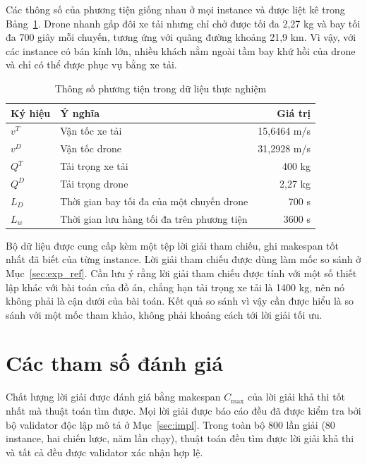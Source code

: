 \documentclass[../DoAn.tex]{subfiles}
\begin{document}
Các thông số của phương tiện giống nhau ở mọi instance và được liệt kê trong Bảng~\ref{tab:vehicle}. Drone nhanh gấp đôi xe tải nhưng chỉ chở được tối đa 2,27 kg và bay tối đa 700 giây mỗi chuyến, tương ứng với quãng đường khoảng 21,9 km. Vì vậy, với các instance có bán kính lớn, nhiều khách nằm ngoài tầm bay khứ hồi của drone và chỉ có thể được phục vụ bằng xe tải.

\begin{table}[H]
\centering
\caption{Thông số phương tiện trong dữ liệu thực nghiệm}
\label{tab:vehicle}
\begin{tabular}{llr}
\toprule
\textbf{Ký hiệu} & \textbf{Ý nghĩa} & \textbf{Giá trị} \\
\midrule
$v^T$ & Vận tốc xe tải & 15,6464 m/s \\
$v^D$ & Vận tốc drone & 31,2928 m/s \\
$Q^T$ & Tải trọng xe tải & 400 kg \\
$Q^D$ & Tải trọng drone & 2,27 kg \\
$L_D$ & Thời gian bay tối đa của một chuyến drone & 700 s \\
$L_w$ & Thời gian lưu hàng tối đa trên phương tiện & 3600 s \\
\bottomrule
\end{tabular}
\end{table}

Bộ dữ liệu được cung cấp kèm một tệp lời giải tham chiếu, ghi makespan tốt nhất đã biết của từng instance. Lời giải tham chiếu được dùng làm mốc so sánh ở Mục~\ref{sec:exp_ref}. Cần lưu ý rằng lời giải tham chiếu được tính với một số thiết lập khác với bài toán của đồ án, chẳng hạn tải trọng xe tải là 1400 kg, nên nó không phải là cận dưới của bài toán. Kết quả so sánh vì vậy cần được hiểu là so sánh với một mốc tham khảo, không phải khoảng cách tới lời giải tối ưu.

\section{Các tham số đánh giá}
\label{sec:exp_metrics}

Chất lượng lời giải được đánh giá bằng makespan $C_{\max}$ của lời giải khả thi tốt nhất mà thuật toán tìm được. Mọi lời giải được báo cáo đều đã được kiểm tra bởi bộ validator độc lập mô tả ở Mục~\ref{sec:impl}. Trong toàn bộ 800 lần giải (80 instance, hai chiến lược, năm lần chạy), thuật toán đều tìm được lời giải khả thi và tất cả đều được validator xác nhận hợp lệ.
\end{document}
